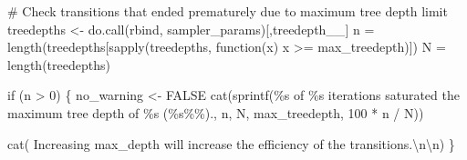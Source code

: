 \documentclass[
  letterpaper,
  DIV=11,
  numbers=noendperiod]{scrartcl}
\newenvironment{Shaded}{\begin{snugshade}}{\end{snugshade}}
\newcommand{\CommentTok}[1]{\textcolor[rgb]{0.37,0.37,0.37}{#1}}
\newcommand{\ConstantTok}[1]{\textcolor[rgb]{0.56,0.35,0.01}{#1}}
\newcommand{\ControlFlowTok}[1]{\textcolor[rgb]{0.00,0.23,0.31}{#1}}
\newcommand{\DecValTok}[1]{\textcolor[rgb]{0.68,0.00,0.00}{#1}}
\newcommand{\FunctionTok}[1]{\textcolor[rgb]{0.28,0.35,0.67}{#1}}
\newcommand{\NormalTok}[1]{\textcolor[rgb]{0.00,0.23,0.31}{#1}}
\newcommand{\OtherTok}[1]{\textcolor[rgb]{0.00,0.23,0.31}{#1}}
\newcommand{\SpecialCharTok}[1]{\textcolor[rgb]{0.37,0.37,0.37}{#1}}
\newcommand{\StringTok}[1]{\textcolor[rgb]{0.13,0.47,0.30}{#1}}
\begin{document}
\begin{Shaded}
\begin{Highlighting}[]
  \CommentTok{\# Check transitions that ended prematurely due to maximum tree depth limit}
\NormalTok{  treedepths }\OtherTok{\textless{}{-}} \FunctionTok{do.call}\NormalTok{(rbind, sampler\_params)[,}\StringTok{\textquotesingle{}treedepth\_\_\textquotesingle{}}\NormalTok{]}
\NormalTok{  n }\OtherTok{=} \FunctionTok{length}\NormalTok{(treedepths[}\FunctionTok{sapply}\NormalTok{(treedepths, }\ControlFlowTok{function}\NormalTok{(x) x }\SpecialCharTok{\textgreater{}=}\NormalTok{ max\_treedepth)])}
\NormalTok{  N }\OtherTok{=} \FunctionTok{length}\NormalTok{(treedepths)}

  \ControlFlowTok{if}\NormalTok{ (n }\SpecialCharTok{\textgreater{}} \DecValTok{0}\NormalTok{) \{}
\NormalTok{    no\_warning }\OtherTok{\textless{}{-}} \ConstantTok{FALSE}
    \FunctionTok{cat}\NormalTok{(}\FunctionTok{sprintf}\NormalTok{(}\StringTok{\textquotesingle{}\%s of \%s iterations saturated the maximum tree depth of \%s (\%s\%\%).\textquotesingle{}}\NormalTok{,}
\NormalTok{                n, N, max\_treedepth, }\DecValTok{100} \SpecialCharTok{*}\NormalTok{ n }\SpecialCharTok{/}\NormalTok{ N))}

    \FunctionTok{cat}\NormalTok{(}\StringTok{\textquotesingle{}  Increasing max\_depth will increase the efficiency of the transitions.}\SpecialCharTok{\textbackslash{}n\textbackslash{}n}\StringTok{\textquotesingle{}}\NormalTok{)}
\NormalTok{  \}}


\end{Highlighting}
\end{Shaded}
\end{document}
